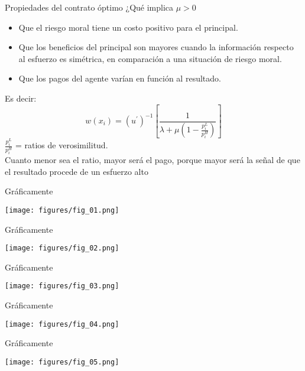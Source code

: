 \begin{frame}{Propiedades del contrato óptimo}
	¿Qué implica $\mu > 0$
		\begin{itemize}
			\item Que el riesgo moral tiene un costo positivo para el principal.
			\item Que los beneficios del principal son mayores cuando la información respecto al esfuerzo es simétrica, en comparación a una situación de riesgo moral.
			\item Que los pagos del agente varían en función al resultado.
		\end{itemize}
	Es decir:
		$$w\left( x_i\right) = \left(  u^\prime \right)^{-1} \left[ \frac{1}{\lambda + \mu \left( 1 - \frac{p_{i}^{L}}{p_{i}^{H}}\right)} \right] $$
	$\frac{p_{i}^{L}}{p_{i}^{H}}$ = ratios de verosimilitud.\\
	
	Cuanto menor sea el ratio, mayor será el pago, porque mayor será la señal de que el resultado procede de un esfuerzo alto
\end{frame}
\begin{frame}{Gráficamente}
	\begin{center}
		\texttt{[image: figures/fig\_01.png]}
	\end{center}
\end{frame}
\begin{frame}{Gráficamente}
	\begin{center}
		\texttt{[image: figures/fig\_02.png]}
	\end{center}
\end{frame}
\begin{frame}{Gráficamente}
	\begin{center}
		\texttt{[image: figures/fig\_03.png]}
	\end{center}
\end{frame}
\begin{frame}{Gráficamente}
	\begin{center}
		\texttt{[image: figures/fig\_04.png]}
	\end{center}
\end{frame}
\begin{frame}{Gráficamente}
	\begin{center}
		\texttt{[image: figures/fig\_05.png]}
	\end{center}
\end{frame}

